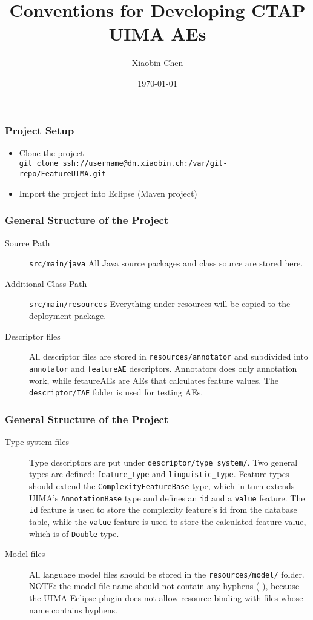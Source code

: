 \documentclass{beamer}
\title[AE Development Conventions]{Conventions for Developing CTAP UIMA AEs}
\author{Xiaobin Chen}
\institute{T\"ubingen University}
\date{\today}
\begin{document}
\frame{\titlepage}

\begin{frame}
\frametitle{Project Setup}
\begin{itemize}
	\item Clone the project \\
		\texttt{git clone
		ssh://username@dn.xiaobin.ch:/var/git-repo/FeatureUIMA.git} 
	\item Import the  project into Eclipse (Maven project)
\end{itemize}
\end{frame}

\begin{frame}
\frametitle{General Structure of the Project}
\begin{description}
	\item [Source Path] \texttt{src/main/java} All Java source packages and
	class source are stored here. 
	\item [Additional Class Path] \texttt{src/main/resources} Everything under
	resources will be copied to the deployment package. 
	\item [Descriptor files] All descriptor files are stored in
	\texttt{resources/annotator} and subdivided into \texttt{annotator} and
	\texttt{featureAE} descriptors. Annotators does only annotation work, while
	fetaureAEs are AEs that calculates feature values. The
	\texttt{descriptor/TAE} folder is used for testing AEs. 
\end{description}
\end{frame}

\begin{frame}
\frametitle{General Structure of the Project}
\begin{description}
	\item [Type system files] Type descriptors are put under
	\texttt{descriptor/type\_system/}. Two general types are defined:
	\texttt{feature\_type} and \texttt{linguistic\_type}. Feature types should
	extend the \texttt{ComplexityFeatureBase} type, which in turn extends UIMA's
	\texttt{AnnotationBase} type and defines an \texttt{id} and a \texttt{value}
	feature. The \texttt{id} feature is used to store the complexity feature's
	id from the database table, while the \texttt{value} feature is used to
	store the calculated feature value, which is of \texttt{Double} type.
	\item [Model files] All language model files should be stored in the
	\texttt{resources/model/} folder. NOTE: the model file name should not
	contain any hyphens (-), because the UIMA Eclipse plugin does not allow
	resource binding with files whose name contains hyphens.
\end{description}
\end{frame}
\end{document}
